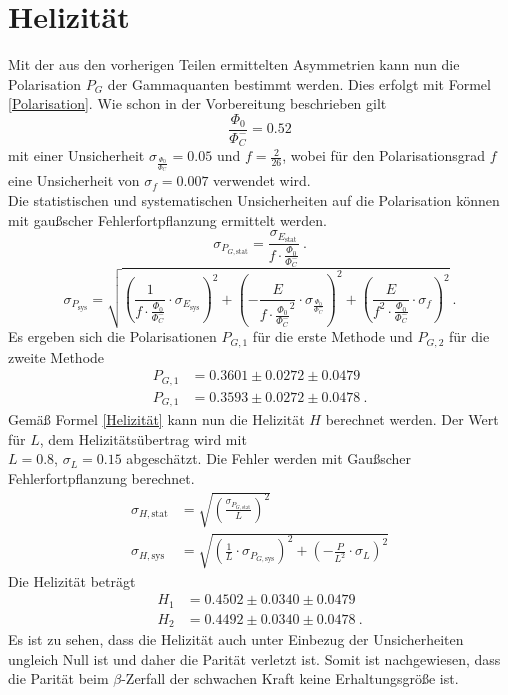 \section{Helizität}
Mit der aus den vorherigen Teilen ermittelten Asymmetrien kann nun die Polarisation $P_{G}$ der Gammaquanten bestimmt werden. Dies erfolgt mit Formel \ref{Polarisation}. Wie schon in der Vorbereitung beschrieben gilt $$\frac{\Phi_0}{\Phi_C^-}= 0.52$$ mit einer Unsicherheit $\sigma_{\frac{\Phi_0}{\Phi_C^-}}=0.05$ und $f=\frac{2}{26}$, wobei für den Polarisationsgrad $f$ eine Unsicherheit von $\sigma_{f}=0.007$ verwendet wird.\\
Die statistischen und systematischen Unsicherheiten auf die Polarisation können mit gaußscher Fehlerfortpflanzung ermittelt werden.
 $$\sigma_{P_{G,\text{stat}}}=\frac{\sigma_{E_\text{stat}}}{f \cdot \frac{\Phi_0}{\Phi_C^-}}~.$$ 
$$\sigma_{P_\text{sys}}=\sqrt{\left(\frac{1}{f \cdot \frac{\Phi_0}{\Phi_C^-}}\cdot \sigma_{E_\text{sys}} \right)^{2} + \left( -\frac{E}{f \cdot \frac{\Phi_0}{\Phi_C^-}^{2}}\cdot \sigma_{\frac{\Phi_0}{\Phi_C^-}}\right)^{2} + \left(\frac{E}{f^{2} \cdot \frac{\Phi_0}{\Phi_C^-}} \cdot \sigma_{f}\right)^{2}} ~.$$
Es ergeben sich die Polarisationen $P_{G,1}$ für die erste Methode und $P_{G,2}$ für die zweite Methode \begin{align*}
    P_{G,1}&=0.3601 \pm 0.0272 \pm 0.0479 \\
    P_{G,1}&=0.3593 \pm 0.0272 \pm 0.0478 ~.
\end{align*} 
Gemäß Formel \ref{Helizität} kann nun die Helizität $H$ berechnet werden. Der Wert für $L$, dem Helizitätsübertrag wird mit \\$L=0.8$, $\sigma_{L}=0.15$ abgeschätzt. Die Fehler werden mit Gaußscher Fehlerfortpflanzung berechnet. 
\begin{align*} 
    \sigma_{H,\text{stat}}&=\sqrt{\left(\frac{\sigma_{P_{G,\text{stat}}}}{L}\right)^{2}} \\
    \sigma_{H,\text{sys}}&=\sqrt{\left(\frac{1}{L}\cdot \sigma_{P_{G,\text{sys}}}\right)^{2} + \left(-\frac{P}{L^{2}}\cdot \sigma_{L}\right)^{2}}
\end{align*} 
Die Helizität beträgt 
\begin{align*} 
    H_{1}&=0.4502 \pm 0.0340 \pm 0.0479 \\
    H_{2}&=0.4492 \pm 0.0340 \pm 0.0478 ~.
\end{align*}
Es ist zu sehen, dass die Helizität auch unter Einbezug der Unsicherheiten ungleich Null ist und daher die Parität verletzt ist. Somit ist nachgewiesen, dass die Parität beim $\beta$-Zerfall der schwachen Kraft keine Erhaltungsgröße ist.